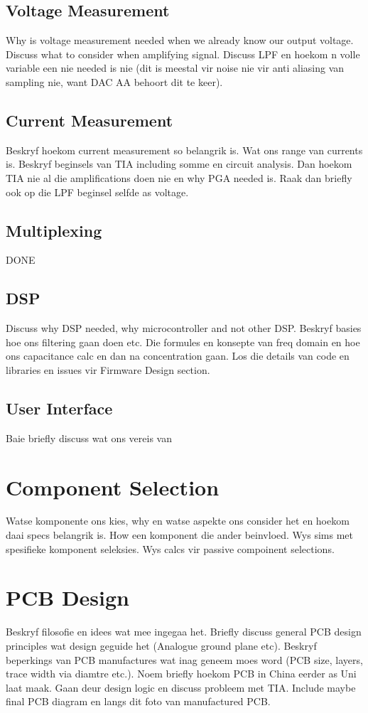 \subsection{Voltage Measurement}
Why is voltage measurement needed when we already know our output voltage. Discuss what to consider when amplifying signal. Discuss LPF en hoekom n volle variable een nie needed is nie (dit is meestal vir noise nie vir anti aliasing van sampling nie, want DAC AA behoort dit te keer).

\subsection{Current Measurement}
Beskryf hoekom current measurement so belangrik is. Wat ons range van currents is. Beskryf beginsels van TIA including somme en circuit analysis. Dan hoekom TIA nie al die amplifications doen nie en why PGA needed is. Raak dan briefly ook op die LPF beginsel selfde as voltage.

\subsection{Multiplexing}
DONE

\subsection{DSP}
Discuss why DSP needed, why microcontroller and not other DSP. Beskryf basies hoe ons filtering gaan doen etc. Die formules en konsepte van freq domain en hoe ons capacitance calc en dan na concentration gaan. Los die details van code en libraries en issues vir Firmware Design section.

\subsection{User Interface}
Baie briefly discuss wat ons vereis van

\section{Component Selection}
Watse komponente ons kies, why en watse aspekte ons consider het en hoekom daai specs belangrik is. How een komponent die ander beinvloed. Wys sims met spesifieke komponent seleksies. Wys calcs vir passive compoinent selections.

\section{PCB Design}
Beskryf filosofie en idees wat mee ingegaa het. Briefly discuss general PCB design principles wat design geguide het (Analogue ground plane etc). Beskryf beperkings van PCB manufactures wat inag geneem moes word (PCB size, layers, trace width via diamtre etc.). Noem briefly hoekom PCB in China eerder as Uni laat maak. Gaan deur design logic en discuss probleem met TIA. Include maybe final PCB diagram en langs dit foto van manufactured PCB.

